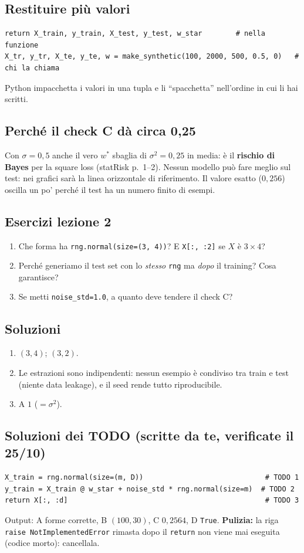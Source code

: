\documentclass[11pt,a4paper]{article}
\begin{document}
\subsection{Restituire più valori}
\begin{lstlisting}
return X_train, y_train, X_test, y_test, w_star        # nella funzione
X_tr, y_tr, X_te, y_te, w = make_synthetic(100, 2000, 500, 0.5, 0)   # chi la chiama
\end{lstlisting}
Python impacchetta i valori in una tupla e li ``spacchetta'' nell'ordine in cui li hai scritti.

\subsection{Perché il check C dà circa 0,25}
Con $\sigma = 0{,}5$ anche il vero $w^*$ sbaglia di $\sigma^2 = 0{,}25$ in media: è il \textbf{rischio di Bayes}
per la square loss (statRisk p.~1--2). Nessun modello può fare meglio sul test: nei grafici sarà la linea orizzontale di riferimento.
Il valore esatto ($0{,}256$) oscilla un po' perché il test ha un numero finito di esempi.

\subsection*{Esercizi lezione 2}
\begin{enumerate}
  \item Che forma ha \texttt{rng.normal(size=(3, 4))}? E \texttt{X[:, :2]} se $X$ è $3\times4$?
  \item Perché generiamo il test set con lo \emph{stesso} \texttt{rng} ma \emph{dopo} il training? Cosa garantisce?
  \item Se metti \texttt{noise\_std=1.0}, a quanto deve tendere il check C?
\end{enumerate}
\subsection*{Soluzioni}
\begin{enumerate}
  \item $(3,4)$; $(3,2)$.
  \item Le estrazioni sono indipendenti: nessun esempio è condiviso tra train e test (niente data leakage), e il seed rende tutto riproducibile.
  \item A $1$ ($=\sigma^2$).
\end{enumerate}
\subsection*{Soluzioni dei TODO (scritte da te, verificate il 25/10)}
\begin{lstlisting}
X_train = rng.normal(size=(m, D))                             # TODO 1
y_train = X_train @ w_star + noise_std * rng.normal(size=m)  # TODO 2
return X[:, :d]                                               # TODO 3
\end{lstlisting}
Output: A forme corrette, B $(100,30)$, C $0{,}2564$, D \texttt{True}.
\textbf{Pulizia:} la riga \texttt{raise NotImplementedError} rimasta dopo il \texttt{return} non viene mai eseguita (codice morto): cancellala.
\end{document}
